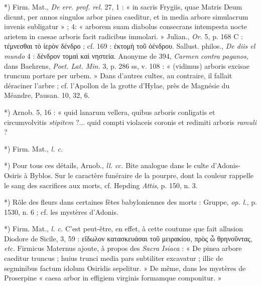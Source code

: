 \documentclass[a4paper, 11pt, oneside, polutonikogreek, french]{article}
\begin{document}
*) Firm. Mat., \emph{De err. prof. rel.} 27, 1 : « in sacris Frygiis, quae Matris Deum dicunt, per annos singulos arbor pinea caeditur, et in media arbore simulacrum iuvenis subligatur » ; 4: « arborem suam diabolus consecrans intempesta nocte arietem in caesae arboris facit radicibus immolari. » Julian., \emph{Or.} 5, p. 168 C : τέμνεσθαι τὸ ἱερὸν δένδρο ; cf. 169 : ἐκτομὴ τοῦ ὀένδρου. Sallust. philos., \emph{De diis el mundo} 4 : δένδρον τομαὶ καὶ νηστεία. Anonyme de 394, \emph{Carmen contra paganos}, dans Baehrens, \emph{Poet. Lat. Min.} 3, p. 286 ss, v. 108 : « (vidimus) arboris excisae truncum portare per urbem. » Dans d'autres cultes, au contraire, il fallait déraciner l'arbre ; cf. l'Apollon de la grotte d'Hylae, près de Magnésie du Méandre, Pausan. 10, 32, 6.

*) Arnob. 5, 16 : « quid lanarum vellera, quibus arboris conligatis et circumvolvitis \emph{stipitem} ?... quid compti violaceis coronis et redimiti arboris \emph{ramuli} ?

*) Firm. Mat., \emph{l. c.}

*) Pour tous ces détails, Arnob., \emph{ll. cc.} Bite analogue dans le culte d'Adonis-Osiris à Byblos. Sur le caractère funéraire de la pourpre, dont la couleur rappelle le sang des sacrifices aux morts, cf. Hepding \emph{Attis}, p. 150, n. 3.

*) Rôle des fleurs dans certaines fêtes babyloniennes des morts : Gruppe, \emph{op. l.}, p. 1530, n. 6 ; cf. les mystères d'Adonis.

*) Firm. Mat., \emph{l. c.} C'est peut-être, en effet, à cette coutume que fait allusion Diodore de Sicile, 3, 59 : εἴδωλον κατασκευάσαι τοῦ μειρακίου, πρὸς ὦ θρηνοῦντας, \emph{etc.} Firmicus Maternus ajoute, à propos des \emph{Sacra Isiaca} : « De pinea arbore caeditur truncus ; huius trunci media pars subtiliter excavatur ; illic de segminibus factum idolum Osiridis sepelitur. » De même, dans les mystères de Proserpine « caesa arbor in effigiem virginis formamque componitur. »
\end{document}
